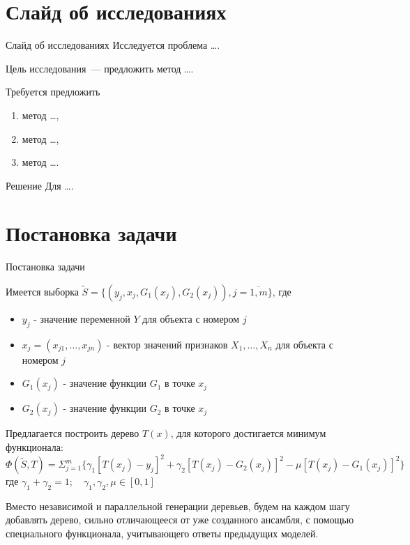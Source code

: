\documentclass[10pt,pdf,hyperref={unicode}]{beamer}
\begin{document}
	
	\begin{frame}
		\titlepage
	\end{frame}
	
	\section{Слайд об исследованиях}
	\begin{frame}{Слайд об исследованиях}
		\bigskip
		Исследуется проблема \ldots.
		\begin{block}{Цель исследования~---}
			предложить метод \ldots.
		\end{block}
		\begin{block}{Требуется предложить}
			\justifying
			\begin{enumerate}[1)]
				\item метод \ldots,
				\item метод \ldots,
				\item метод \ldots.
			\end{enumerate}
		\end{block}
		\begin{block}{Решение}
			Для \ldots.
		\end{block}
	\end{frame}
	
	\section{Постановка задачи}
	\begin{frame}{Постановка задачи}
		
		Имеется выборка $\tilde{S} = \{ (y_j, x_j, G_1(x_j), G_2(x_j)), j = \overline{1, m} \}$, где
		\begin{itemize}
			\item $y_j$ - значение переменной $Y$ для объекта с номером $j$
			\item $x_j = (x_{j1}, \dots, x_{jn})$ - вектор значений признаков $X_1, \dots, X_n$ для объекта с номером $j$
			\item $G_1(x_j)$ - значение функции $G_1$ в точке $x_j$
			\item $G_2(x_j)$ - значение функции $G_2$ в точке $x_j$
		\end{itemize}
		
		Предлагается построить дерево $T(x)$, для которого достигается минимум функционала:
		$$ \Phi(\tilde{S}, T) = \Sigma_{j=1}^{m} \{ \gamma_1 [T(x_j) - y_j]^2 + \gamma_2 [T(x_j) - G_2(x_j)]^2 - \mu [T(x_j) - G_1(x_j)]^2   \}  $$
		где $\gamma_1 + \gamma_2 = 1; \quad \gamma_1, \gamma_2, \mu \in [0, 1] $
		
		\bigskip
		
		Вместо независимой и параллельной генерации деревьев,
		будем на каждом шагу добавлять дерево, сильно отличающееся от уже
		созданного ансамбля, с помощью специального функционала,
		учитывающего ответы предыдущих моделей.
		

	\end{frame}
	

	

	

	
\end{document}
